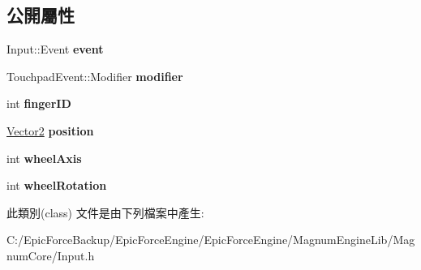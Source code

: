 \subsection*{公開屬性}
\begin{DoxyCompactItemize}
\item 
Input\+::\+Event {\bfseries event}\hypertarget{class_magnum_1_1_input_1_1_touchpad_event_aebf7d337dffc47081c9add640f5a6ab8}{}\label{class_magnum_1_1_input_1_1_touchpad_event_aebf7d337dffc47081c9add640f5a6ab8}

\item 
Touchpad\+Event\+::\+Modifier {\bfseries modifier}\hypertarget{class_magnum_1_1_input_1_1_touchpad_event_aae3e25c257da6365579bd6a745922ecf}{}\label{class_magnum_1_1_input_1_1_touchpad_event_aae3e25c257da6365579bd6a745922ecf}

\item 
int {\bfseries finger\+ID}\hypertarget{class_magnum_1_1_input_1_1_touchpad_event_a3b19106c6adcf16108ce17a28abc5caf}{}\label{class_magnum_1_1_input_1_1_touchpad_event_a3b19106c6adcf16108ce17a28abc5caf}

\item 
\hyperlink{class_magnum_1_1_vector2}{Vector2} {\bfseries position}\hypertarget{class_magnum_1_1_input_1_1_touchpad_event_a359f7bdabbe45b9ffcb040744fc2d21c}{}\label{class_magnum_1_1_input_1_1_touchpad_event_a359f7bdabbe45b9ffcb040744fc2d21c}

\item 
int {\bfseries wheel\+Axis}\hypertarget{class_magnum_1_1_input_1_1_touchpad_event_acddc1a486b1ffcd17fd7aa78b68b81e1}{}\label{class_magnum_1_1_input_1_1_touchpad_event_acddc1a486b1ffcd17fd7aa78b68b81e1}

\item 
int {\bfseries wheel\+Rotation}\hypertarget{class_magnum_1_1_input_1_1_touchpad_event_a05945f17c10c6d4c36b1e568d8bcaec8}{}\label{class_magnum_1_1_input_1_1_touchpad_event_a05945f17c10c6d4c36b1e568d8bcaec8}

\end{DoxyCompactItemize}


此類別(class) 文件是由下列檔案中產生\+:\begin{DoxyCompactItemize}
\item 
C\+:/\+Epic\+Force\+Backup/\+Epic\+Force\+Engine/\+Epic\+Force\+Engine/\+Magnum\+Engine\+Lib/\+Magnum\+Core/Input.\+h\end{DoxyCompactItemize}
